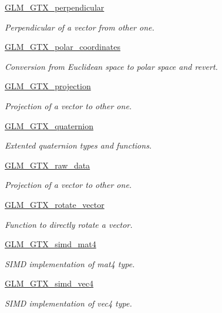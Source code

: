 \begin{DoxyCompactItemize}
\hyperlink{group__gtx__perpendicular}{G\+L\+M\+\_\+\+G\+T\+X\+\_\+perpendicular}
\begin{DoxyCompactList}\small\item\em Perpendicular of a vector from other one. \end{DoxyCompactList}\item 
\hyperlink{group__gtx__polar__coordinates}{G\+L\+M\+\_\+\+G\+T\+X\+\_\+polar\+\_\+coordinates}
\begin{DoxyCompactList}\small\item\em Conversion from Euclidean space to polar space and revert. \end{DoxyCompactList}\item 
\hyperlink{group__gtx__projection}{G\+L\+M\+\_\+\+G\+T\+X\+\_\+projection}
\begin{DoxyCompactList}\small\item\em Projection of a vector to other one. \end{DoxyCompactList}\item 
\hyperlink{group__gtx__quaternion}{G\+L\+M\+\_\+\+G\+T\+X\+\_\+quaternion}
\begin{DoxyCompactList}\small\item\em Extented quaternion types and functions. \end{DoxyCompactList}\item 
\hyperlink{group__gtx__raw__data}{G\+L\+M\+\_\+\+G\+T\+X\+\_\+raw\+\_\+data}
\begin{DoxyCompactList}\small\item\em Projection of a vector to other one. \end{DoxyCompactList}\item 
\hyperlink{group__gtx__rotate__vector}{G\+L\+M\+\_\+\+G\+T\+X\+\_\+rotate\+\_\+vector}
\begin{DoxyCompactList}\small\item\em Function to directly rotate a vector. \end{DoxyCompactList}\item 
\hyperlink{group__gtx__simd__mat4}{G\+L\+M\+\_\+\+G\+T\+X\+\_\+simd\+\_\+mat4}
\begin{DoxyCompactList}\small\item\em S\+I\+M\+D implementation of mat4 type. \end{DoxyCompactList}\item 
\hyperlink{group__gtx__simd__vec4}{G\+L\+M\+\_\+\+G\+T\+X\+\_\+simd\+\_\+vec4}
\begin{DoxyCompactList}\small\item\em S\+I\+M\+D implementation of vec4 type. \end{DoxyCompactList}\item 

\end{DoxyCompactItemize}
